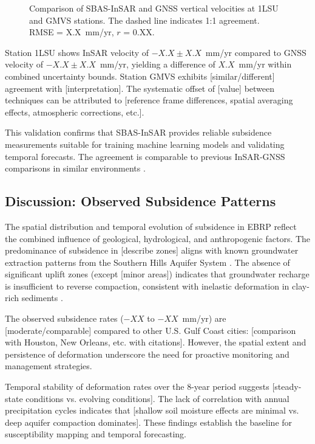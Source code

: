 \begin{figure}[!t]
\centering
\caption{Comparison of SBAS-InSAR and GNSS vertical velocities at 1LSU and GMVS stations. The dashed line indicates 1:1 agreement. RMSE = X.X~mm/yr, $r$ = 0.XX.}
\label{fig:gnss_validation}
\end{figure}

Station 1LSU shows InSAR velocity of $-X.X \pm X.X$~mm/yr compared to GNSS velocity of $-X.X \pm X.X$~mm/yr, yielding a difference of $X.X$~mm/yr within combined uncertainty bounds. Station GMVS exhibits [similar/different] agreement with [interpretation]. The systematic offset of [value] between techniques can be attributed to [reference frame differences, spatial averaging effects, atmospheric corrections, etc.].

This validation confirms that SBAS-InSAR provides reliable subsidence measurements suitable for training machine learning models and validating temporal forecasts. The agreement is comparable to previous InSAR-GNSS comparisons in similar environments \citep{Abdalla2024}.

\subsection{Discussion: Observed Subsidence Patterns}

The spatial distribution and temporal evolution of subsidence in EBRP reflect the combined influence of geological, hydrological, and anthropogenic factors. The predominance of subsidence in [describe zones] aligns with known groundwater extraction patterns from the Southern Hills Aquifer System \citep{cite regional study}. The absence of significant uplift zones (except [minor areas]) indicates that groundwater recharge is insufficient to reverse compaction, consistent with inelastic deformation in clay-rich sediments \citep{Higgins2016}.

The observed subsidence rates ($-XX$ to $-XX$~mm/yr) are [moderate/comparable] compared to other U.S. Gulf Coast cities: [comparison with Houston, New Orleans, etc. with citations]. However, the spatial extent and persistence of deformation underscore the need for proactive monitoring and management strategies.

Temporal stability of deformation rates over the 8-year period suggests [steady-state conditions vs. evolving conditions]. The lack of correlation with annual precipitation cycles indicates that [shallow soil moisture effects are minimal vs. deep aquifer compaction dominates]. These findings establish the baseline for susceptibility mapping and temporal forecasting.


